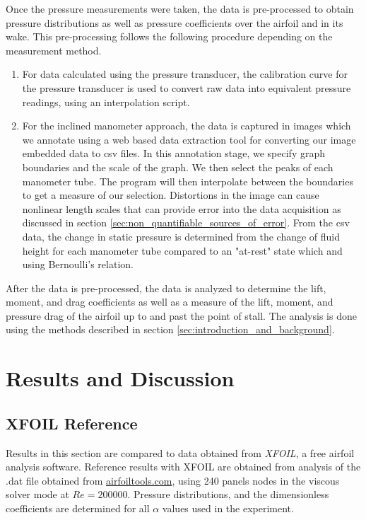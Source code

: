 \documentclass[runningheads]{llncs}
\begin{document}
Once the pressure measurements were taken, the data is pre-processed to obtain pressure distributions as well as pressure coefficients over the airfoil and in its wake. This pre-processing follows the following procedure depending on the measurement method.

\begin{enumerate}

    \item For data calculated using the pressure transducer, the calibration curve for the pressure transducer is used to convert raw data into equivalent pressure readings, using an interpolation script.

    \item For the inclined manometer approach, the data is captured in images which we annotate using a web based data extraction tool for converting our image embedded data to csv files.\cite{Rohatgi2020} In this annotation stage, we specify graph boundaries and the scale of the graph. We then select the peaks of each manometer tube. The program will then interpolate between the boundaries to get a measure of our selection. Distortions in the image can cause nonlinear length scales that can provide error into the data acquisition as discussed in section \ref{sec:non_quantifiable_sources_of_error}. From the csv data, the change in static pressure is determined from the change of fluid height for each manometer tube compared to an "at-rest" state which and using Bernoulli's relation.

\end{enumerate}

After the data is pre-processed, the data is analyzed to determine the lift, moment, and drag coefficients as well as a measure of the lift, moment, and pressure drag of the airfoil up to and past the point of stall. The analysis is done using the methods described in section \ref{sec:introduction_and_background}.




\section{Results and Discussion}

\subsection{XFOIL Reference}
Results in this section are compared to data obtained from \textit{XFOIL}, a free airfoil analysis software. Reference results with XFOIL are obtained from analysis of the .dat file obtained from \href{http://airfoiltools.com/airfoil/details?airfoil=clarky-il}{airfoiltools.com}, using 240 panels nodes in the viscous solver mode at $Re = 200000$. Pressure distributions, and the dimensionless coefficients are determined for all $\alpha$ values used in the experiment.
\end{document}
